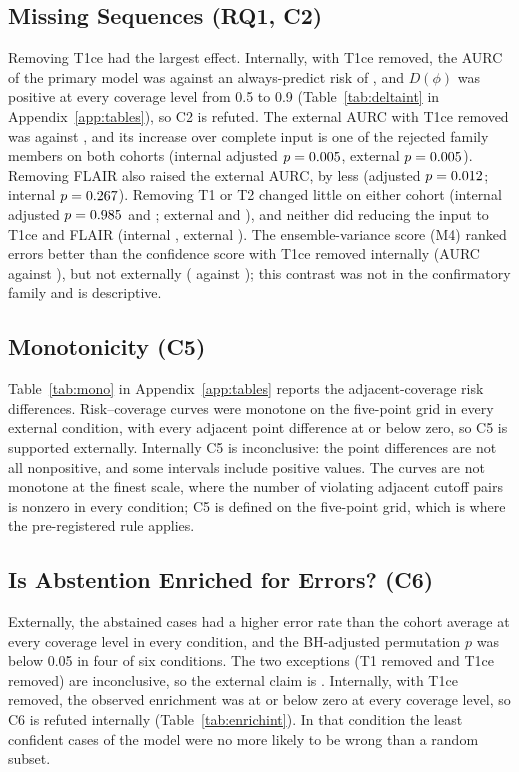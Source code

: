 \documentclass[journal]{IEEEtran}
\begin{document}
\subsection{Missing Sequences (RQ1, C2)}
Removing T1ce had the largest effect. Internally, with T1ce removed, the AURC of the primary model was \numIntAurcMTwoDropTonece{} against an always-predict risk of \numIntAlwaysDropTonece{}, and $D(\phi)$ was positive at every coverage level from 0.5 to 0.9 (Table~\ref{tab:deltaint} in Appendix~\ref{app:tables}), so C2 is refuted. The external AURC with T1ce removed was \numExtAurcMTwoDropTonece{} against \numExtAlwaysDropTonece{}, and its increase over complete input is one of the rejected family members on both cohorts (internal adjusted $p=0.005$, external $p=0.005$). Removing FLAIR also raised the external AURC, by less (adjusted $p=0.012$; internal $p=0.267$). Removing T1 or T2 changed little on either cohort (internal adjusted $p=0.985$ and \numFamUBThreeAdj{}; external \numFamXBOneAdj{} and \numFamXBThreeAdj{}), and neither did reducing the input to T1ce and FLAIR (internal \numFamUBFiveAdj{}, external \numFamXBFiveAdj{}). The ensemble-variance score (M4) ranked errors better than the confidence score with T1ce removed internally (AURC \numIntAurcMFourDropTonece{} against \numIntAurcMTwoDropTonece{}), but not externally (\numExtAurcMFourDropTonece{} against \numExtAurcMTwoDropTonece{}); this contrast was not in the confirmatory family and is descriptive.

\subsection{Monotonicity (C5)}
Table~\ref{tab:mono} in Appendix~\ref{app:tables} reports the adjacent-coverage risk differences. Risk--coverage curves were monotone on the five-point grid in every external condition, with every adjacent point difference at or below zero, so C5 is supported externally. Internally C5 is inconclusive: the point differences are not all nonpositive, and some intervals include positive values. The curves are not monotone at the finest scale, where the number of violating adjacent cutoff pairs is nonzero in every condition; C5 is defined on the five-point grid, which is where the pre-registered rule applies.

\subsection{Is Abstention Enriched for Errors? (C6)}
Externally, the abstained cases had a higher error rate than the cohort average at every coverage level in every condition, and the BH-adjusted permutation $p$ was below 0.05 in four of six conditions. The two exceptions (T1 removed and T1ce removed) are inconclusive, so the external claim is \numStatusCSixExt. Internally, with T1ce removed, the observed enrichment was at or below zero at every coverage level, so C6 is refuted internally (Table~\ref{tab:enrichint}). In that condition the least confident cases of the model were no more likely to be wrong than a random subset.
\end{document}
